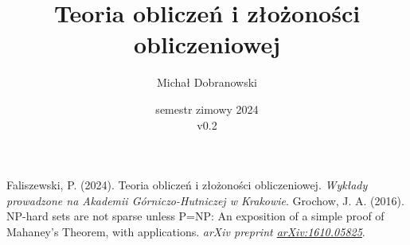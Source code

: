 \documentclass{scrartcl}
\title{Teoria obliczeń i złożoności obliczeniowej}
\author{Michał Dobranowski}
\date{semestr zimowy 2024 \\ v0.2}
\begin{document}
    \maketitle
    \tableofcontents
    \newpage

    \SetVertexStyle[FillColor=gray, FillOpacity=0.4]
    \SetEdgeStyle[Color=black, LineWidth=0.8pt]

    
    

    \begin{thebibliography}{9}
         Faliszewski, P. (2024). Teoria obliczeń i złożoności obliczeniowej. \textit{Wykłady prowadzone na Akademii Górniczo-Hutniczej w Krakowie}.
         Grochow, J. A. (2016). NP-hard sets are not sparse unless P=NP: An exposition of a simple proof of Mahaney's Theorem, with applications. \textit{arXiv preprint \href{https://arxiv.org/abs/1610.05825}{arXiv:1610.05825}}.
    \end{thebibliography}
\end{document}

